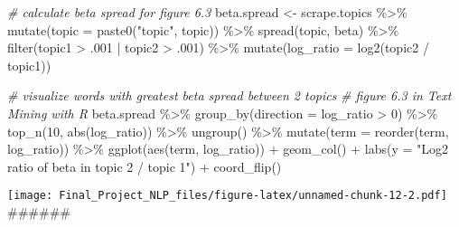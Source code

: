 \documentclass[
]{article}
\newenvironment{Shaded}{\begin{snugshade}}{\end{snugshade}}
\newcommand{\AttributeTok}[1]{\textcolor[rgb]{0.77,0.63,0.00}{#1}}
\newcommand{\CommentTok}[1]{\textcolor[rgb]{0.56,0.35,0.01}{\textit{#1}}}
\newcommand{\DecValTok}[1]{\textcolor[rgb]{0.00,0.00,0.81}{#1}}
\newcommand{\FunctionTok}[1]{\textcolor[rgb]{0.00,0.00,0.00}{#1}}
\newcommand{\NormalTok}[1]{#1}
\newcommand{\OtherTok}[1]{\textcolor[rgb]{0.56,0.35,0.01}{#1}}
\newcommand{\SpecialCharTok}[1]{\textcolor[rgb]{0.00,0.00,0.00}{#1}}
\newcommand{\StringTok}[1]{\textcolor[rgb]{0.31,0.60,0.02}{#1}}
\begin{document}
\begin{Shaded}
\begin{Highlighting}[]
\CommentTok{\# calculate beta spread for figure 6.3}
\NormalTok{beta.spread }\OtherTok{\textless{}{-}}\NormalTok{ scrape.topics }\SpecialCharTok{\%\textgreater{}\%}
  \FunctionTok{mutate}\NormalTok{(}\AttributeTok{topic =} \FunctionTok{paste0}\NormalTok{(}\StringTok{"topic"}\NormalTok{, topic)) }\SpecialCharTok{\%\textgreater{}\%}
  \FunctionTok{spread}\NormalTok{(topic, beta) }\SpecialCharTok{\%\textgreater{}\%}
  \FunctionTok{filter}\NormalTok{(topic1 }\SpecialCharTok{\textgreater{}}\NormalTok{ .}\DecValTok{001} \SpecialCharTok{|}\NormalTok{ topic2 }\SpecialCharTok{\textgreater{}}\NormalTok{ .}\DecValTok{001}\NormalTok{) }\SpecialCharTok{\%\textgreater{}\%}
  \FunctionTok{mutate}\NormalTok{(}\AttributeTok{log\_ratio =} \FunctionTok{log2}\NormalTok{(topic2 }\SpecialCharTok{/}\NormalTok{ topic1))}

\CommentTok{\# visualize words with greatest beta spread between 2 topics}
\CommentTok{\# figure 6.3 in Text Mining with R}
\NormalTok{beta.spread }\SpecialCharTok{\%\textgreater{}\%}
  \FunctionTok{group\_by}\NormalTok{(}\AttributeTok{direction =}\NormalTok{ log\_ratio }\SpecialCharTok{\textgreater{}} \DecValTok{0}\NormalTok{) }\SpecialCharTok{\%\textgreater{}\%}
  \FunctionTok{top\_n}\NormalTok{(}\DecValTok{10}\NormalTok{, }\FunctionTok{abs}\NormalTok{(log\_ratio)) }\SpecialCharTok{\%\textgreater{}\%}
  \FunctionTok{ungroup}\NormalTok{() }\SpecialCharTok{\%\textgreater{}\%}
  \FunctionTok{mutate}\NormalTok{(}\AttributeTok{term =} \FunctionTok{reorder}\NormalTok{(term, log\_ratio)) }\SpecialCharTok{\%\textgreater{}\%}
  \FunctionTok{ggplot}\NormalTok{(}\FunctionTok{aes}\NormalTok{(term, log\_ratio)) }\SpecialCharTok{+}
  \FunctionTok{geom\_col}\NormalTok{() }\SpecialCharTok{+}
  \FunctionTok{labs}\NormalTok{(}\AttributeTok{y =} \StringTok{"Log2 ratio of beta in topic 2 / topic 1"}\NormalTok{) }\SpecialCharTok{+}
  \FunctionTok{coord\_flip}\NormalTok{()}
\end{Highlighting}
\end{Shaded}

\texttt{[image: Final\_Project\_NLP\_files/figure-latex/unnamed-chunk-12-2.pdf]}
\#\#\#\#\#\#
\end{document}
